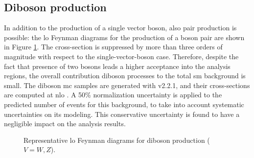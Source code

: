 \subsection{Diboson production}

In addition to the production of a single vector boson, also pair production is possible: 
the \gls{lo} Feynman diagrams for the production of a boson pair are shown in Figure \ref{fig:dib_prod}.
The cross-section is suppressed by more than three orders of magnitude with respect to the 
single-vector-boson case. 
Therefore, despite the fact that presence of two bosons leads a higher acceptance into the analysis regions,
the overall contribution diboson processes to the total \gls{sm} background is small. 
The diboson \gls{mc} samples are generated with \Sherpa v2.2.1, and their cross-sections are computed at \gls{nlo} \cite{ATL-PHYS-PUB-2016-002,ATL-PHYS-PUB-2017-005}.
A 50\% normalization uncertainty is applied to the predicted number of events for this background, to take into account 
systematic uncertainties on its modeling. This conservative uncertainty is found to have a negligible impact on the analysis results. 


\begin{figure}[h!]
\centering 
{}
\caption{Representative \gls{lo} Feynman diagrams for diboson production  ($V=W, Z$).}\label{fig:dib_prod}
\end{figure}



